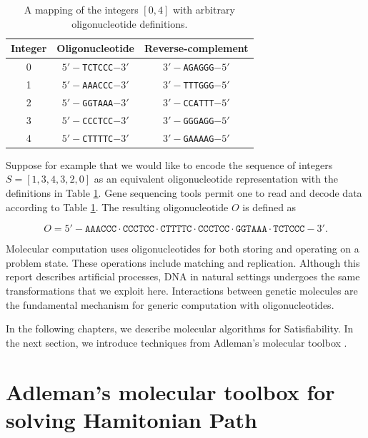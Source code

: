 \begin{table}[htdp]
\caption{A mapping of the integers $[0,4]$ with arbitrary oligonucleotide definitions.}
\begin{center}
\begin{tabular}{|c|c|c|}
\hline
 \textbf{Integer} & \textbf{Oligonucleotide} & \textbf{Reverse-complement}\\ \hline
0 & $5'-$\texttt{TCTCCC}$-3'$ & $3'-$\texttt{AGAGGG}$-5'$ \\
1 & $5'-$\texttt{AAACCC}$-3'$ & $3'-$\texttt{TTTGGG}$-5'$ \\
2 & $5'-$\texttt{GGTAAA}$-3'$ & $3'-$\texttt{CCATTT}$-5'$ \\
3 & $5'-$\texttt{CCCTCC}$-3'$ & $3'-$\texttt{GGGAGG}$-5'$ \\
4 & $5'-$\texttt{CTTTTC}$-3'$ & $3'-$\texttt{GAAAAG}$-5'$ \\ \hline
\end{tabular}
\end{center}
\label{integer2OligoTable}
\end{table}%

Suppose for example that we would like to encode the sequence of integers $S = [1, 3, 4, 3, 2, 0]$ as an equivalent oligonucleotide representation with the definitions in Table \ref{integer2OligoTable}.  Gene sequencing tools permit one to read and decode data according to Table \ref{integer2OligoTable}.  The resulting oligonucleotide $O$ is defined as

\[
O = 5'-\texttt{AAACCC}\cdot \texttt{CCCTCC}\cdot \texttt{CTTTTC}\cdot \texttt{CCCTCC}\cdot \texttt{GGTAAA}\cdot \texttt{TCTCCC}-3'.
\]

Molecular computation uses oligonucleotides for both storing and operating on a problem state.  These operations include matching and replication.  Although this report describes artificial processes, DNA in natural settings undergoes the same transformations that we exploit here.  Interactions between genetic molecules are the fundamental mechanism for generic computation with oligonucleotides.
	
In the following chapters, we describe molecular algorithms for {\sc Satisfiability}.  In the next section, we introduce techniques from Adleman's molecular toolbox \cite{Adleman:1994:MCS:189441.189442}.

\section{Adleman's molecular toolbox for solving {\sc Hamitonian Path}}
	
